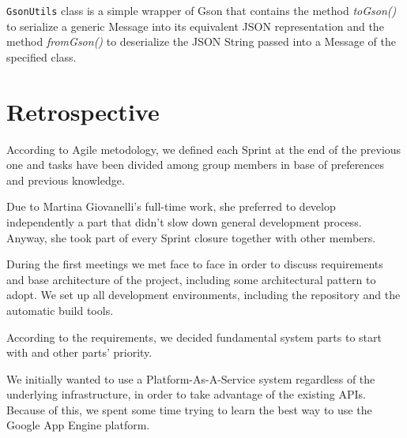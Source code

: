 \documentclass[a4paper,12pt]{report}
\begin{document}
\texttt{GsonUtils} class is a simple wrapper of Gson that contains the method \textit{toGson()} to serialize a generic Message into its equivalent JSON representation and the method \textit{fromGson()} to deserialize the JSON String passed into a Message of the specified class.

\chapter{Retrospective}


According to Agile metodology, we defined each Sprint at the end of the previous one and tasks have been divided among group members in base of preferences and previous knowledge.

Due to Martina Giovanelli's full-time work, she preferred to develop independently a part that didn't slow down general development process. Anyway, she took part of every Sprint closure together with other members.

During the first meetings we met face to face in order to discuss requirements and base architecture of the project, including some architectural pattern to adopt.
We set up all development environments, including the repository and the automatic build tools.

According to the requirements, we decided fundamental system parts to start with and other parts' priority.

We initially wanted to use a Platform-As-A-Service system regardless of the underlying infrastructure, in order to take advantage of the existing APIs. Because of this, we spent some time trying to learn the best way to use the Google App Engine platform.
\end{document}
